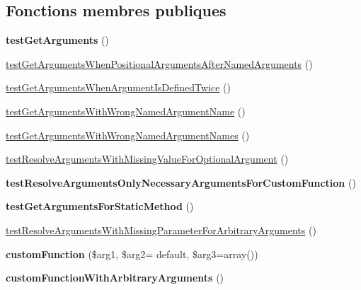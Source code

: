 \subsection*{Fonctions membres publiques}
\begin{DoxyCompactItemize}
\item 
{\bfseries test\+Get\+Arguments} ()\hypertarget{class_twig___tests___node___expression___call_test_a8d82fab2979421a0bbb9e3315599a10f}{}\label{class_twig___tests___node___expression___call_test_a8d82fab2979421a0bbb9e3315599a10f}

\item 
\hyperlink{class_twig___tests___node___expression___call_test_a198397d30564e58445344de197d537a5}{test\+Get\+Arguments\+When\+Positional\+Arguments\+After\+Named\+Arguments} ()
\item 
\hyperlink{class_twig___tests___node___expression___call_test_a0b6eac9d2b9248059d2eb22ce2c6aa2e}{test\+Get\+Arguments\+When\+Argument\+Is\+Defined\+Twice} ()
\item 
\hyperlink{class_twig___tests___node___expression___call_test_add498b2ca52e1e3571f41a651422f182}{test\+Get\+Arguments\+With\+Wrong\+Named\+Argument\+Name} ()
\item 
\hyperlink{class_twig___tests___node___expression___call_test_a64d877708569bfe47b61005cb8f1d5e2}{test\+Get\+Arguments\+With\+Wrong\+Named\+Argument\+Names} ()
\item 
\hyperlink{class_twig___tests___node___expression___call_test_a2a125325156f3974ed34d8d9327a01c6}{test\+Resolve\+Arguments\+With\+Missing\+Value\+For\+Optional\+Argument} ()
\item 
{\bfseries test\+Resolve\+Arguments\+Only\+Necessary\+Arguments\+For\+Custom\+Function} ()\hypertarget{class_twig___tests___node___expression___call_test_a67f0ed032a776a66f2a4218c4e0e2825}{}\label{class_twig___tests___node___expression___call_test_a67f0ed032a776a66f2a4218c4e0e2825}

\item 
{\bfseries test\+Get\+Arguments\+For\+Static\+Method} ()\hypertarget{class_twig___tests___node___expression___call_test_aaa4bffb0890aacb4f29bf6798259f83b}{}\label{class_twig___tests___node___expression___call_test_aaa4bffb0890aacb4f29bf6798259f83b}

\item 
\hyperlink{class_twig___tests___node___expression___call_test_a77741aea9d4caadf206560fedff876a0}{test\+Resolve\+Arguments\+With\+Missing\+Parameter\+For\+Arbitrary\+Arguments} ()
\item 
{\bfseries custom\+Function} (\$arg1, \$arg2= \textquotesingle{}default\textquotesingle{}, \$arg3=array())\hypertarget{class_twig___tests___node___expression___call_test_a7cbb0827f72c0246cf40463dbc838c85}{}\label{class_twig___tests___node___expression___call_test_a7cbb0827f72c0246cf40463dbc838c85}

\item 
{\bfseries custom\+Function\+With\+Arbitrary\+Arguments} ()\hypertarget{class_twig___tests___node___expression___call_test_a7953eb657956c5c09fd4997317d661d4}{}\label{class_twig___tests___node___expression___call_test_a7953eb657956c5c09fd4997317d661d4}

\end{DoxyCompactItemize}
